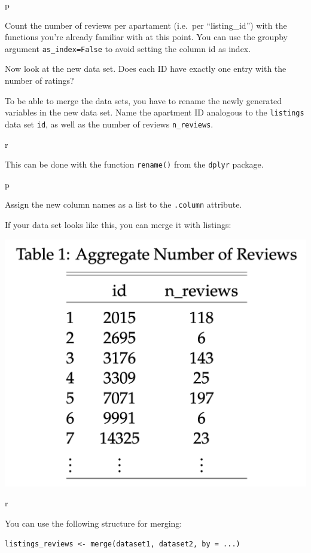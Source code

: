 \documentclass[
  11pt,
]{book}
\begin{document}
\begin{tipsp}p

Count the number of reviews per apartament (i.e.~per ``listing\_id'')
with the functions you're already familiar with at this point. You can
use the groupby argument \texttt{as\_index=False} to avoid setting the
column id as index.

\end{tipsp}

Now look at the new data set. Does each ID have exactly one entry with
the number of ratings?

To be able to merge the data sets, you have to rename the newly
generated variables in the new data set. Name the apartment ID analogous
to the \texttt{listings} data set \texttt{id}, as well as the number of
reviews \texttt{n\_reviews}.

\begin{tips}r

This can be done with the function \texttt{rename()} from the
\texttt{dplyr} package.

\end{tips}

\begin{tipsp}p

Assign the new column names as a list to the \texttt{.column} attribute.

\end{tipsp}

If your data set looks like this, you can merge it with listings:

\begin{center}\includegraphics[width=0.4\linewidth]{plot/2_merging_table} \end{center}

\begin{tips}r

You can use the following structure for merging:

\texttt{listings\_reviews\ \textless{}-\ merge(dataset1,\ dataset2,\ by\ =\ ...)}

\end{tips}
\end{document}
